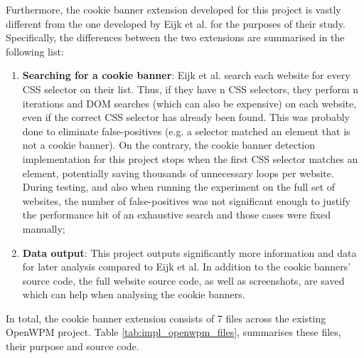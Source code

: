 \documentclass[../main.tex]{subfiles}
\begin{document}
Furthermore, the cookie banner extension developed for this project is vastly different from the one developed by Eijk et al. for the purposes of their study. Specifically, the differences between the two extensions are summarised in the following list:

\begin{enumerate}
    \item \textbf{Searching for a cookie banner}: Eijk et al. search each website for every CSS selector on their list. Thus, if they have n CSS selectors, they perform n iterations and DOM searches (which can also be expensive) on each website, even if the correct CSS selector has already been found. This was probably done to eliminate false-positives (e.g. a selector matched an element that is not a cookie banner). On the contrary, the cookie banner detection implementation for this project stops when the first CSS selector matches an element, potentially saving thousands of unnecessary loops per website. During testing, and also when running the experiment on the full set of websites, the number of false-positives was not significant enough to justify the performance hit of an exhaustive search and those  cases were fixed manually;
    
    \item \textbf{Data output}: This project outputs significantly more information and data for later analysis compared to Eijk et al. In addition to the cookie banners’ source code, the full website source code, as well as screenshots, are saved which can help when analysing the cookie banners.
\end{enumerate}

In total, the cookie banner extension consists of 7 files across the existing OpenWPM project. Table \ref{tab:impl_openwpm_files}, summarises these files, their purpose and source code.
\end{document}
